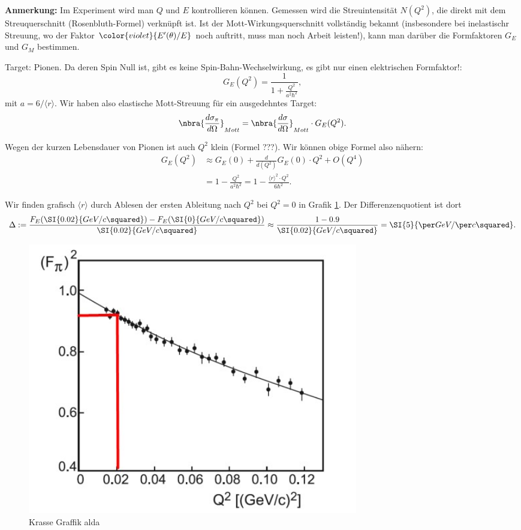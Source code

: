 \documentclass{subfiles}
\begin{document}
                \textbf{Anmerkung:} Im Experiment wird man $Q$ und $E$ kontrollieren können. Gemessen wird die Streuintensität $N(Q^2)$, die direkt mit dem Streuquerschnitt (Rosenbluth-Formel) verknüpft ist. Ist der Mott-Wirkungsquerschnitt vollständig bekannt (insbesondere bei inelastischr Streuung, wo der Faktor $\color{violet}{E'(\theta)/E}$ noch auftritt, muss man noch Arbeit leisten!), kann man darüber die Formfaktoren $G_E$ und $G_M$ bestimmen.

        \subaufgabe{}
                Target: Pionen. Da deren Spin Null ist, gibt es keine Spin-Bahn-Wechselwirkung, es gibt nur einen elektrischen Formfaktor!:
                \[
                        G_E(Q^2) = \frac{1}{1 + \frac{Q^2}{a^2\hbar^2}},
                \]
                mit $a = 6/ \langle r\rangle$. Wir haben also elastische Mott-Streuung für ein ausgedehntes Target:
                \[
                        \nbra{\frac{d\sigma_\pi}{d\Omega}}_{Mott} = \nbra{\frac{d\sigma}{d\Omega}}_{Mott}\cdot G_E(Q^2).   
                \]
                
                Wegen der kurzen Lebensdauer von Pionen ist auch $Q^2$ klein (Formel ???). Wir können obige Formel also nähern:
                \begin{align*}
                        G_E(Q^2) &\approx G_E(0) + \frac{d}{d(Q^2)}G_E(0)\cdot Q^2 + O(Q^4)\\
                        &= 1 - \frac{Q^2}{a^2\hbar^2} = 1 - \frac{\langle r\rangle^2\cdot Q^2}{6\hbar^2}.
                \end{align*}

        \subaufgabe{}
                Wir finden grafisch $\langle r\rangle$ durch Ablesen der ersten Ableitung nach $Q^2$ bei $Q^2=0$ in Grafik \ref{fig:A1cGrafik}. Der Differenzenquotient ist dort 
                \[
                        \Delta := \frac{F_E(\SI{0.02}{GeV/c\squared}) - F_E(\SI{0}{GeV/c\squared})}{\SI{0.02}{GeV/c\squared}} \approx \frac{1 - 0.9}{\SI{0.02}{GeV/c\squared}} = \SI{5}{\per GeV/\per c\squared}.       
                \]

                \begin{figure}[H]
                        \centering
                        \includegraphics[width=0.7\textwidth]{Bilddateien/A1cGrafik.jpg}
                        \caption{Krasse Graffik alda}
                        \label{fig:A1cGrafik}
                \end{figure}
                
\end{document}
